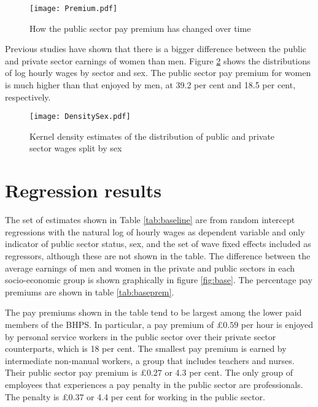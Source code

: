 \documentclass[a4paper,11pt,titlepage]{article}
\begin{document}
\begin{figure}[tb]
    \centering
    \texttt{[image: Premium.pdf]}
    \caption{How the public sector pay premium has changed over time\label{fig:premium}}
\end{figure}



Previous studies have shown that there is a bigger difference between the public and private sector earnings of women than men.  Figure \ref{fig:densitysex} shows the distributions of log hourly wages by sector and sex.  The public sector pay premium for women is much higher than that enjoyed by men, at 39.2 per cent and 18.5 per cent, respectively.

\begin{figure}[tb]
    \centering
    \texttt{[image: DensitySex.pdf]}
    \caption{Kernel density estimates of the distribution of public and private sector wages split by sex\label{fig:densitysex}}
\end{figure}


\section{Regression results}
The set of estimates shown in Table \ref{tab:baseline} are from random intercept regressions with the natural log of hourly wages as dependent variable and only indicator of public sector status, sex, and the set of wave fixed effects included as regressors, although these are not shown in the table.  The difference between the average earnings of men and women in the private and public sectors in each socio-economic group is shown graphically in figure \ref{fig:base}. The percentage pay premiums are shown in table \ref{tab:baseprem}.

The pay premiums shown in the table tend to be largest among the lower paid
members of the BHPS. In particular, a pay premium of \pounds $0.59$ per hour is enjoyed by personal service workers in the public sector over their private sector counterparts,
which is 18 per cent. The smallest pay premium is earned by intermediate non-manual
workers, a group that includes teachers and nurses. Their public sector pay premium
is \pounds $0.27$ or 4.3 per cent. The only group of employees that experiences a pay penalty in
the public sector are professionals. The penalty is \pounds $0.37$ or 4.4 per cent for working in
the public sector.
\end{document}
